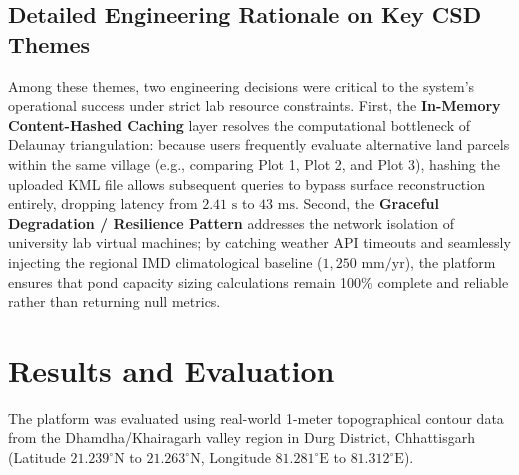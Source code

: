 \documentclass[manuscript,screen]{acmart}
\begin{document}
\subsection{Detailed Engineering Rationale on Key CSD Themes}
Among these themes, two engineering decisions were critical to the system's operational success under strict lab resource constraints. First, the \textbf{In-Memory Content-Hashed Caching} layer resolves the computational bottleneck of Delaunay triangulation: because users frequently evaluate alternative land parcels within the same village (e.g., comparing Plot 1, Plot 2, and Plot 3), hashing the uploaded KML file allows subsequent queries to bypass surface reconstruction entirely, dropping latency from $2.41\text{ s}$ to $43\text{ ms}$. Second, the \textbf{Graceful Degradation / Resilience Pattern} addresses the network isolation of university lab virtual machines; by catching weather API timeouts and seamlessly injecting the regional IMD climatological baseline ($1,250\text{ mm/yr}$), the platform ensures that pond capacity sizing calculations remain 100\% complete and reliable rather than returning null metrics.

\section{Results and Evaluation}
\label{sec:results}
The platform was evaluated using real-world 1-meter topographical contour data from the Dhamdha/Khairagarh valley region in Durg District, Chhattisgarh (Latitude $21.239^\circ\text{N}$ to $21.263^\circ\text{N}$, Longitude $81.281^\circ\text{E}$ to $81.312^\circ\text{E}$).
\end{document}
